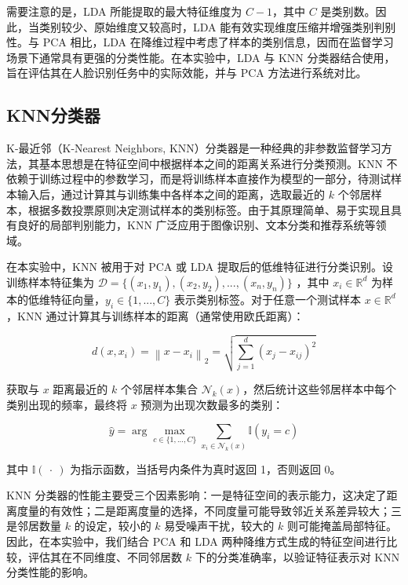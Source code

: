 \documentclass[a4paper, utf8]{ctexart}
\begin{document}
	需要注意的是，LDA 所能提取的最大特征维度为 $C-1$，其中 $C$ 是类别数。因此，当类别较少、原始维度又较高时，LDA 能有效实现维度压缩并增强类别判别性。与 PCA 相比，LDA 在降维过程中考虑了样本的类别信息，因而在监督学习场景下通常具有更强的分类性能\cite{pcavslda}。在本实验中，LDA 与 KNN 分类器结合使用，旨在评估其在人脸识别任务中的实际效能，并与 PCA 方法进行系统对比。
	
	\subsection{KNN分类器}
	
	K-最近邻（K-Nearest Neighbors, KNN）分类器是一种经典的非参数监督学习方法，其基本思想是在特征空间中根据样本之间的距离关系进行分类预测。KNN 不依赖于训练过程中的参数学习，而是将训练样本直接作为模型的一部分，待测试样本输入后，通过计算其与训练集中各样本之间的距离，选取最近的 $k$ 个邻居样本，根据多数投票原则决定测试样本的类别标签\cite{knn}。由于其原理简单、易于实现且具有良好的局部判别能力，KNN 广泛应用于图像识别、文本分类和推荐系统等领域\cite{ml1, ml2, ml3}。
	
	在本实验中，KNN 被用于对 PCA 或 LDA 提取后的低维特征进行分类识别。设训练样本特征集为 $\mathcal{D} = \{ (x_1, y_1), (x_2, y_2), ... , (x_n, y_n) \}$ ，其中 $x_i \in \mathbb{R}^d$ 为样本的低维特征向量，$y_i \in \{ 1, ... , C \}$ 表示类别标签。对于任意一个测试样本 $x \in \mathbb{R}^d$，KNN 通过计算其与训练样本的距离（通常使用欧氏距离）：
	
	\vspace{-.5em}
	\begin{equation}
		d(x, x_i) = \left\| x-x_i \right\|_2 = \sqrt{\sum_{j=1}^d (x_j - x_{ij})^2}
	\end{equation}
	 
	获取与 $x$ 距离最近的 $k$ 个邻居样本集合 $\mathcal{N}_k(x)$，然后统计这些邻居样本中每个类别出现的频率，最终将 $x$ 预测为出现次数最多的类别：
	
	\vspace{-.5em}
	\begin{equation}
		\hat{y} = \arg \max\limits_{c \in \{ 1, ... , C \}} \sum_{x_i \in \mathcal{N}_k(x)} \mathbb{I}(y_i = c)
	\end{equation}
	
	其中 $\mathbb{I}(\ \cdot\ )$ 为指示函数，当括号内条件为真时返回 1，否则返回 0。
	
	KNN 分类器的性能主要受三个因素影响：一是特征空间的表示能力，这决定了距离度量的有效性；二是距离度量的选择，不同度量可能导致邻近关系差异较大；三是邻居数量 $k$ 的设定，较小的 $k$ 易受噪声干扰，较大的 $k$ 则可能掩盖局部特征。因此，在本实验中，我们结合 PCA 和 LDA 两种降维方式生成的特征空间进行比较，评估其在不同维度、不同邻居数 $k$ 下的分类准确率，以验证特征表示对 KNN 分类性能的影响。
	
\end{document}
